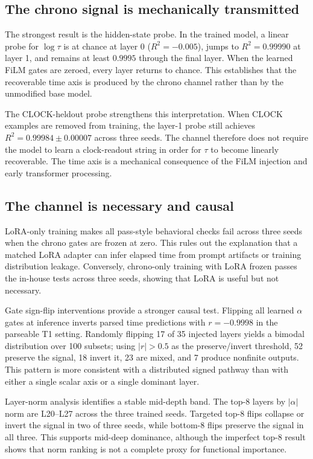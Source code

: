 \documentclass[conference,10pt]{IEEEtran}
\newcommand{\Tau}{\tau}
\begin{document}
\subsection{The chrono signal is mechanically transmitted}

The strongest result is the hidden-state probe. In the trained model, a linear probe for $\log\Tau$ is at chance at layer 0 ($R^2=-0.005$), jumps to $R^2=0.99990$ at layer 1, and remains at least $0.9995$ through the final layer. When the learned FiLM gates are zeroed, every layer returns to chance. This establishes that the recoverable time axis is produced by the chrono channel rather than by the unmodified base model.

The CLOCK-heldout probe strengthens this interpretation. When CLOCK examples are removed from training, the layer-1 probe still achieves $R^2=0.99984\pm0.00007$ across three seeds. The channel therefore does not require the model to learn a clock-readout string in order for $\Tau$ to become linearly recoverable. The time axis is a mechanical consequence of the FiLM injection and early transformer processing.

\subsection{The channel is necessary and causal}

LoRA-only training makes all pass-style behavioral checks fail across three seeds when the chrono gates are frozen at zero. This rules out the explanation that a matched LoRA adapter can infer elapsed time from prompt artifacts or training distribution leakage. Conversely, chrono-only training with LoRA frozen passes the in-house tests across three seeds, showing that LoRA is useful but not necessary.

Gate sign-flip interventions provide a stronger causal test. Flipping all learned $\alpha$ gates at inference inverts parsed time predictions with $r=-0.9998$ in the parseable T1 setting. Randomly flipping 17 of 35 injected layers yields a bimodal distribution over 100 subsets; using $|r|>0.5$ as the preserve/invert threshold, 52 preserve the signal, 18 invert it, 23 are mixed, and 7 produce nonfinite outputs. This pattern is more consistent with a distributed signed pathway than with either a single scalar axis or a single dominant layer.

Layer-norm analysis identifies a stable mid-depth band. The top-8 layers by $|\alpha|$ norm are L20--L27 across the three trained seeds. Targeted top-8 flips collapse or invert the signal in two of three seeds, while bottom-8 flips preserve the signal in all three. This supports mid-deep dominance, although the imperfect top-8 result shows that norm ranking is not a complete proxy for functional importance.
\end{document}

